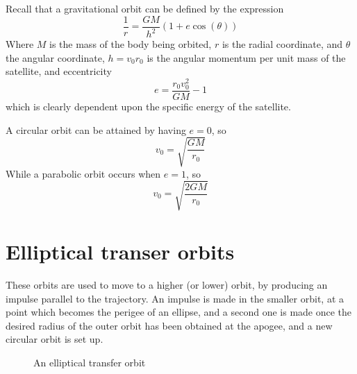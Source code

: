Recall that a gravitational orbit can be defined by the expression
\begin{equation}
  \label{eq:1}
  \frac{1}{r} = \frac{GM}{h^2} (1+ e \cos(\theta))
\end{equation}
Where $M$ is the mass of the body being orbited, $r$ is the radial
coordinate, and $\theta$ the angular coordinate, $h = v_0 r_0$ is the
angular momentum per unit mass of the satellite, and eccentricity
\begin{equation}
  \label{eq:2}
  e = \frac{r_0 v_0^2}{GM} - 1
\end{equation}
which is clearly dependent upon the specific energy of the satellite. 

A circular orbit can be attained by having $e=0$, so \[ v_0 =
\sqrt{\frac{GM}{r_0}} \]
While a parabolic orbit occurs when $e=1$, so
\[ v_0 = \sqrt{\frac{2GM}{r_0}} \]

\section{Elliptical transer orbits}
\label{sec:ellipt-trans-orbits}

These orbits are used to move to a higher (or lower) orbit, by
producing an impulse parallel to the trajectory. An impulse is made in
the smaller orbit, at a point which becomes the perigee of an ellipse,
and a second one is made once the desired radius of the outer orbit
has been obtained at the apogee, and a new circular orbit is set up.

\begin{figure}[h]
  \centering
  \caption{An elliptical transfer orbit}
  \label{fig:elliptical-transfer}
\end{figure}

